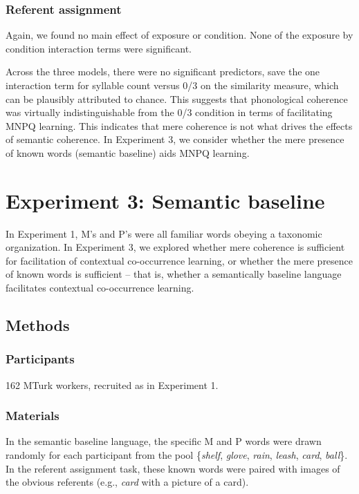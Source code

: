 \documentclass[man,floatsintext]{apa6}
\begin{document}
\subsubsection{Referent assignment}
Again, we found no main effect of exposure or condition. None of the exposure by condition interaction terms were significant.

Across the three models, there were no significant predictors, save the one interaction term for syllable count versus 0/3 on the similarity measure, which can be plausibly attributed to chance. This suggests that phonological coherence was virtually indistinguishable from the 0/3 condition in terms of facilitating MNPQ learning. This indicates that mere coherence is not what drives the effects of semantic coherence. In Experiment 3, we consider whether the mere presence of known words (semantic baseline) aids MNPQ learning.

\section{Experiment 3: Semantic baseline}

In Experiment 1, M's and P's were all familiar words obeying a taxonomic organization. In Experiment 3, we explored whether mere coherence is sufficient for facilitation of contextual co-occurrence learning, or whether the mere presence of known words is sufficient -- that is, whether a semantically baseline language facilitates contextual co-occurrence learning.

\subsection{Methods}
\subsubsection{Participants}
162 MTurk workers, recruited as in Experiment 1.

\subsubsection{Materials}
In the semantic baseline language, the specific M and P words were drawn randomly for each participant from the pool \{\emph{shelf}, \emph{glove}, \emph{rain}, \emph{leash}, \emph{card}, \emph{ball}\}. In the referent assignment task, these known words were paired with images of the obvious referents (e.g., \emph{card} with a picture of a card).
\end{document}
